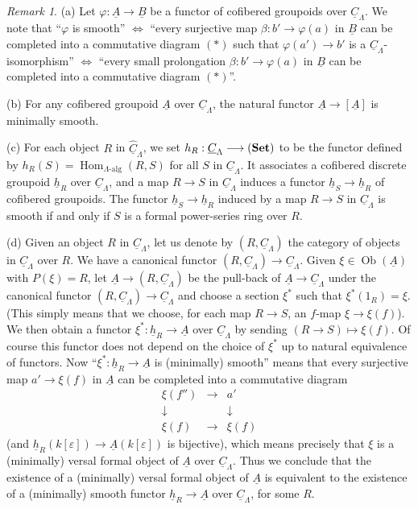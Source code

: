 \documentclass[11pt]{article}
\theoremstyle{plain}
\theoremstyle{definition}
\theoremstyle{remark}
\newtheorem{remark}[theorem]{Remark}
\DeclareMathOperator{\Hom}{Hom}
\DeclareMathOperator{\Ob}{Ob}
\newcommand{\uA}{\underline{A}}\newcommand{\uH}{\underline{H}}\newcommand{\uExt}{\underline{\operatorname{Ext}}}\newcommand{\uL}{\underline{L}}\newcommand{\uM}{\underline{M}}\newcommand{\uZ}{\underline{Z}}\newcommand{\uB}{\underline{B}}\newcommand{\uC}{\underline{C}}\newcommand{\uD}{\underline{D}}\newcommand{\uE}{\underline{E}}\newcommand{\uG}{\underline{G}}\newcommand{\uP}{\underline{P}}\newcommand{\uQ}{\underline{Q}}
\begin{document}
\begin{remark}
\textup{(a)} Let $\varphi : \uA \longrightarrow \uB$ be a functor of cofibered groupoids over $\underline{C}_{\Lambda}$. We note that ``$\varphi$ is smooth'' $\Leftrightarrow$ ``every surjective map $\beta : b' \longrightarrow \varphi(a)$ in $\uB$ can be completed into a commutative diagram $(*)$ such that $\varphi(a') \longrightarrow b'$ is a $\underline{C}_{\Lambda}$-isomorphism'' $\Leftrightarrow$ ``every small prolongation $\beta : b' \longrightarrow \varphi(a)$ in $\uB$ can be completed into a commutative diagram $(*)$''.

\textup{(b)} For any cofibered groupoid $\uA$ over $\underline{C}_{\Lambda}$, the natural functor $\uA \longrightarrow [\uA]$ is minimally smooth.

\textup{(c)} For each object $R$ in $\widehat{\underline{C}}_{\Lambda}$, we set $h_R : \underline{C}_{\Lambda} \longrightarrow (\mathbf{Set})$ to be the functor defined by $h_R(S) = \Hom_{\Lambda\text{-alg}}(R,S)$ for all $S$ in $\underline{C}_{\Lambda}$. It associates a cofibered discrete groupoid $\underline{h}_R$ over $\underline{C}_{\Lambda}$, and a map $R \longrightarrow S$ in $\underline{C}_{\Lambda}$ induces a functor $\underline{h}_S \to \underline{h}_R$ of cofibered groupoids. The functor $\underline{h}_S \to \underline{h}_R$ induced by a map $R \to S$ in $\underline{C}_{\Lambda}$ is smooth if and only if $S$ is a formal power-series ring over $R$.

\textup{(d)} Given an object $R$ in $\underline{C}_{\Lambda}$, let us denote by $(R, \underline{C}_{\Lambda})$ the category of objects in $\underline{C}_{\Lambda}$ over $R$. We have a canonical functor $(R, \underline{C}_{\Lambda}) \to \underline{C}_{\Lambda}$. Given $\xi \in \Ob(\uA)$ with $P(\xi) = R$, let $\uA \to (R, \underline{C}_{\Lambda})$ be the pull-back of $\uA \to \underline{C}_{\Lambda}$ under the canonical functor $(R, \underline{C}_{\Lambda}) \to \underline{C}_{\Lambda}$ and choose a section $\xi^*$ such that $\xi^*(1_R) = \xi$. (This simply means that we choose, for each map $R \to S$, an $f$-map $\xi \to \xi(f)$). We then obtain a functor $\xi^* : \underline{h}_R \to \uA$ over $\underline{C}_{\Lambda}$ by sending $(R \to S) \mapsto \xi(f)$. Of course this functor does not depend on the choice of $\xi^*$ up to natural equivalence of functors. Now ``$\xi^* : \underline{h}_R \to \uA$ is (minimally) smooth'' means that every surjective map $a' \to \xi(f)$ in $\uA$ can be completed into a commutative diagram
\[
\begin{array}{ccc}
\xi(f'') & \longrightarrow & a' \\
\downarrow & & \downarrow \\
\xi(f) & \longrightarrow & \xi(f)
\end{array}
\]
(and $\underline{h}_R(k[\varepsilon]) \to \uA(k[\varepsilon])$ is bijective), which means precisely that $\xi$ is a (minimally) versal formal object of $\uA$ over $\underline{C}_{\Lambda}$. Thus we conclude that the existence of a (minimally) versal formal object of $\uA$ is equivalent to the existence of a (minimally) smooth functor $\underline{h}_R \to \uA$ over $\underline{C}_{\Lambda}$, for some $R$.
\end{remark}
\end{document}
